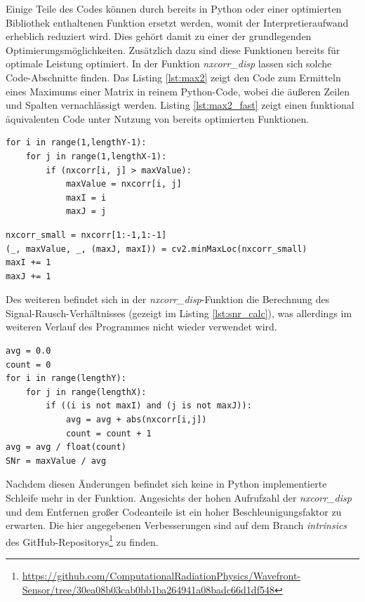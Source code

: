 Einige Teile des Codes können durch bereits in Python oder einer optimierten Bibliothek enthaltenen Funktion ersetzt werden, womit der Interpretieraufwand erheblich reduziert wird. Dies gehört damit zu einer der grundlegenden Optimierungsmöglichkeiten. Zusätzlich dazu sind diese Funktionen bereits für optimale Leistung optimiert. In der Funktion \textit{nxcorr\_disp} lassen sich solche Code-Abschnitte finden. Das Listing \ref{lst:max2} zeigt den Code zum Ermitteln eines Maximums einer Matrix in reinem Python-Code, wobei die äußeren Zeilen und Spalten vernachlässigt werden. Listing \ref{lst:max2_fast} zeigt einen funktional äquivalenten Code unter Nutzung von bereits optimierten Funktionen. 

\begin{lstlisting}[caption={Finden des Maximums einer Matrix}, label={lst:max2}]
for i in range(1,lengthY-1):
	for j in range(1,lengthX-1):
		if (nxcorr[i, j] > maxValue):
			maxValue = nxcorr[i, j]
			maxI = i
			maxJ = j
\end{lstlisting}

\begin{lstlisting}[caption={Finden des Maximums einer Matrix mittels NumPy und OpenCV}, label={lst:max2_fast}]
nxcorr_small = nxcorr[1:-1,1:-1]
(_, maxValue, _, (maxJ, maxI)) = cv2.minMaxLoc(nxcorr_small)
maxI += 1
maxJ += 1
\end{lstlisting}

Des weiteren befindet sich in der \textit{nxcorr\_disp}-Funktion die Berechnung des Signal-Rausch-Verhältnisses (gezeigt im Listing \ref{lst:snr_calc}), was allerdings im weiteren Verlauf des Programmes nicht wieder verwendet wird. 

\begin{lstlisting}[caption={Berechnung des Signal-Rausch-Verhältnisses}, label={lst:snr_calc}]
avg = 0.0
count = 0
for i in range(lengthY):
	for j in range(lengthX):
		if ((i is not maxI) and (j is not maxJ)):
			avg = avg + abs(nxcorr[i,j])
			count = count + 1
avg = avg / float(count)
SNr = maxValue / avg
\end{lstlisting}

Nachdem diesen Änderungen befindet sich keine in Python implementierte Schleife mehr in der Funktion. Angesichts der hohen Aufrufzahl der \textit{nxcorr\_disp} und dem Entfernen großer Codeanteile ist ein hoher Beschleunigungsfaktor zu erwarten. Die hier angegebenen Verbesserungen sind auf dem Branch \textit{intrinsics} des GitHub-Repositorys\footnote{\url{https://github.com/ComputationalRadiationPhysics/Wavefront-Sensor/tree/30ea08b03cab0bb1ba264941a08badc66d1df548}} zu finden. 

